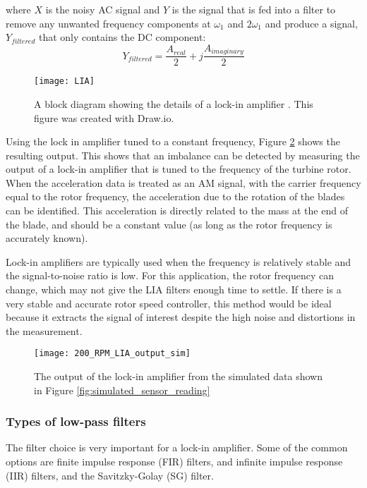 where $X$ is the noisy AC signal and $Y$ is the signal that is fed into a filter to remove any unwanted frequency components at $\omega_1$ and $2 \omega_1$ and produce a signal, $Y_{filtered}$ that only contains the DC component:
\begin{equation}
	Y_{filtered} = \frac{A_{real}}{2} + j \frac{A_{imaginary}}{2}
\end{equation}

\begin{figure}
	\centering
	\texttt{[image: LIA]}
	\decoRule
	\caption{A block diagram showing the details of a lock-in amplifier \cite{LIA_fig}.  This figure was created with Draw.io.}
	\label{fig:LIA}
\end{figure}

Using the lock in amplifier tuned to a constant frequency, Figure \ref{fig:200_RPM_LIA_output_sim} shows the resulting output.  This shows that an imbalance can be detected by measuring the output of a lock-in amplifier that is tuned to the frequency of the turbine rotor.  When the acceleration data is treated as an AM signal, with the carrier frequency equal to the rotor frequency, the acceleration due to the rotation of the blades can be identified.  This acceleration is directly related to the mass at the end of the blade, and should be a constant value (as long as the rotor frequency is accurately known).

Lock-in amplifiers are typically used when the frequency is relatively stable and the signal-to-noise ratio is low.  For this application, the rotor frequency can change, which may not give the LIA filters enough time to settle.  If there is a very stable and accurate rotor speed controller, this method would be ideal because it extracts the signal of interest despite the high noise and distortions in the measurement.

\begin{figure}
	\centering
	\texttt{[image: 200\_RPM\_LIA\_output\_sim]}
	\decoRule
	\caption{The output of the lock-in amplifier from the simulated data shown in Figure \ref{fig:simulated_sensor_reading}}
	\label{fig:200_RPM_LIA_output_sim}
\end{figure}


\subsubsection{Types of low-pass filters}
The filter choice is very important for a lock-in amplifier.  Some of the common options are finite impulse response (FIR) filters, and infinite impulse response (IIR) filters, and the Savitzky-Golay (SG) filter.

